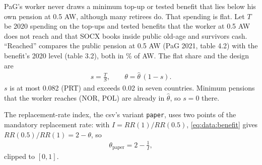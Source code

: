 PaG's worker never draws a minimum top-up or tested benefit that lies below his own pension at 0.5 AW, although many retirees do. That spending is flat. Let $T$ be 2020 spending on the top-ups and tested benefits that the worker at 0.5 AW does not reach and that SOCX books inside public old-age and survivors cash. ``Reached'' compares the public pension at 0.5 AW (PaG 2021, table 4.2) with the benefit's 2020 level (table 3.2), both in \% of AW. The flat share and the design are
\begin{align}
    s = \frac{T}{S}, \qquad \theta = \hat\theta\,(1-s). \label{eq:data:theta}
\end{align}
$s$ is at most 0.082 (PRT) and exceeds 0.02 in seven countries. Minimum pensions that the worker reaches (NOR, POL) are already in $\hat\theta$, so $s = 0$ there.

The replacement-rate index, the csv's variant \texttt{paper}, uses two points of the mandatory replacement rate: with $I = RR(1)/RR(0.5)$, \cref{eq:data:benefit} gives $RR(0.5)/RR(1) = 2-\theta$, so
\begin{align}
    \theta_{\text{paper}} = 2 - \frac{1}{I}, \label{eq:data:thetaPaper}
\end{align}
clipped to $[0,1]$.
